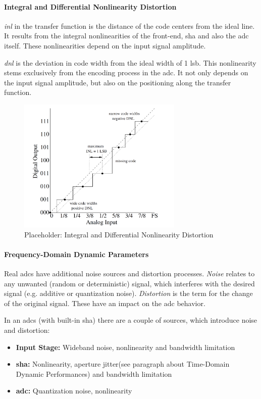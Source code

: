 \paragraph{Integral and Differential Nonlinearity Distortion} 
\textit{\gls{inl}} in the transfer function is the distance of the code centers from the ideal line. It results from the integral nonlinearities of the front-end, \gls{sha} and also the \gls{adc} itself. \cite{walt} These nonlinearities depend on the input signal amplitude. \cite{Lundberg}

\textit{\gls{dnl}} is the deviation in code width from the ideal width of 1 \gls{lsb}. This nonlinearity stems exclusively from the encoding process in the \gls{adc}. \cite{walt} It not only depends on the input signal amplitude, but also on the positioning along the transfer function. \cite{Lundberg}

\begin{figure}[tbh]
	\centering
	\includegraphics[width = 0.7\textwidth]{chap/02-theory/img/dnld}
	\caption{Placeholder: Integral and Differential Nonlinearity Distortion \cite{Lundberg}}
	\label{fig:nld}
\end{figure}
\paragraph{Frequency-Domain Dynamic Parameters}
Real \glspl{adc} have additional noise sources and distortion processes. \textit{Noise} relates to any unwanted (random or deterministic) signal, which interferes with the desired signal (e.g. additive or quantization noise). \textit{Distortion} is the term for the change of the original signal. These have an impact on the \gls{adc} behavior. 

In an \glspl{adc} (with built-in \gls{sha}) there are a couple of sources, which introduce noise and distortion:
\begin{itemize}
	\item \textbf{Input Stage:} Wideband noise, nonlinearity and bandwidth limitation
	\item \textbf{\gls{sha}:} Nonlinearity, aperture jitter(see paragraph about Time-Domain Dynamic Performances)  and bandwidth limitation
	\item \textbf{\gls{adc}:} Quantization noise, nonlinearity
\end{itemize}

